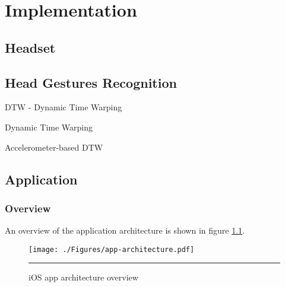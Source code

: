 \chapter{Implementation}

\section{Headset}

\section{Head Gestures Recognition}

DTW - Dynamic Time Warping 

Dynamic Time Warping \cite{salvador_toward_2007}

Accelerometer-based DTW \cite{akl_accelerometer-based_2010}

\section{Application}

\subsection{Overview}
An overview of the application architecture is shown in figure \ref{fig:apparchitecture}.

\begin{figure}[htbp]
	\centering
		\texttt{[image: ./Figures/app-architecture.pdf]}
		\rule{35em}{1pt}
	\caption[App architecture]{iOS app architecture overview}
	\label{fig:apparchitecture}
\end{figure}





